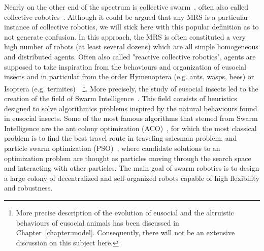     Nearly on the other end of the spectrum is collective swarm~\cite{Beni2005}, often also called collective robotics~\cite{Kube1993, Parker2008}. Although it could be argued that any MRS is a particular instance of collective robotics, we will stick here with this popular definition as to not generate confusion. In this approach, the MRS is often constituted a very high number of robots (at least several dozens) which are all simple homogeneous and distributed agents. Often also called "reactive collective robotics", agents are supposed to take inspiration from the behaviours and organization of eusocial insects and in particular from the order Hymenoptera (e.g. ants, wasps, bees) or Isoptera (e.g. termites)~\cite{Wilson1998, Werfel2014}~\footnote{More precise description of the evolution of eusocial and the altruistic behaviours of eusocial animals has been discussed in Chapter~\ref{chapter:model}. Consequently, there will not be an extensive discussion on this subject here.}. More precisely, the study of eusocial insects led to the creation of the field of Swarm Intelligence~\cite{Bonabeau1999, Zoghby2013}. This field consists of heuristics designed to solve algorithmics problems inspired by the natural behaviours found in eusocial insects. Some of the most famous algorithms that stemed from Swarm Intelligence are the ant colony optimization (ACO)~\cite{Dorigo2004a}, for which the most classical problem is to find the best travel route in traveling salesman problem, and particle swarm optimization (PSO)~\cite{Kennedy1995}, where candidate solutions to an optimization problem are thought as particles moving through the search space and interacting with other particles. The main goal of swarm robotics is to design a large colony of decentralized and self-organized robots capable of high flexibility and robustness.

